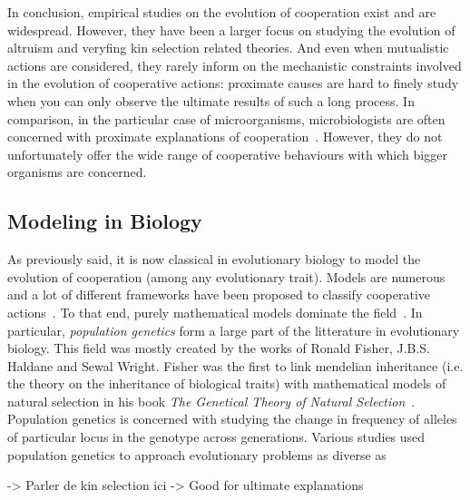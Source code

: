     In conclusion, empirical studies on the evolution of cooperation exist and are widespread. However, they have been a larger focus on studying the evolution of altruism and veryfing kin selection related theories. And even when mutualistic actions are considered, they rarely inform on the mechanistic constraints involved in the evolution of cooperative actions: proximate causes are hard to finely study when you can only observe the ultimate results of such a long process. In comparison, in the particular case of microorganisms, microbiologists are often concerned with proximate explanations of cooperation~\cite{West2006}. However, they do not unfortunately offer the wide range of cooperative behaviours with which bigger organisms are concerned.



  \subsection{Modeling in Biology}

    As previously said, it is now classical in evolutionary biology to model the evolution of cooperation (among any evolutionary trait). Models are numerous and a lot of different frameworks have been proposed to classify cooperative actions~\cite{Dugatkin2002, Sachs2004, Lehmann2006}. To that end, purely mathematical models dominate the field~\cite{Servedio2014}. In particular, \emph{population genetics} form a large part of the litterature in evolutionary biology. This field was mostly created by the works of Ronald Fisher, J.B.S. Haldane and Sewal Wright. Fisher was the first to link mendelian inheritance (i.e. the theory on the inheritance of biological traits) with mathematical models of natural selection in his book \textit{The Genetical Theory of Natural Selection}~\cite{Fisher1930}. Population genetics is concerned with studying the change in frequency of alleles of particular locus in the genotype across generations. Various studies used population genetics to approach evolutionary problems as diverse as 
    
    -> Parler de kin selection ici
    -> Good for ultimate explanations


